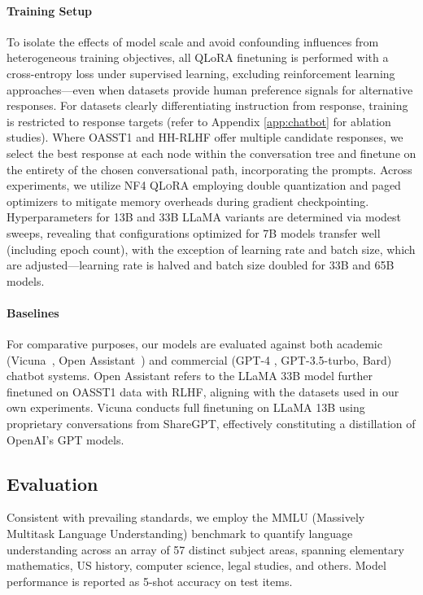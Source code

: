 \paragraph{Training Setup} To isolate the effects of model scale and avoid confounding influences from heterogeneous training objectives, all QLoRA finetuning is performed with a cross-entropy loss under supervised learning, excluding reinforcement learning approaches—even when datasets provide human preference signals for alternative responses. For datasets clearly differentiating instruction from response, training is restricted to response targets (refer to Appendix \ref{app:chatbot} for ablation studies). Where OASST1 and HH-RLHF offer multiple candidate responses, we select the best response at each node within the conversation tree and finetune on the entirety of the chosen conversational path, incorporating the prompts. Across experiments, we utilize NF4 \textsc{QLoRA} employing double quantization and paged optimizers to mitigate memory overheads during gradient checkpointing. Hyperparameters for 13B and 33B LLaMA variants are determined via modest sweeps, revealing that configurations optimized for 7B models transfer well (including epoch count), with the exception of learning rate and batch size, which are adjusted—learning rate is halved and batch size doubled for 33B and 65B models.

\paragraph{Baselines} For comparative purposes, our models are evaluated against both academic (Vicuna~\citep{vicuna2023}, Open Assistant~\citep{kopf2023openassistant}) and commercial (GPT-4 \citep{openai2023gpt}, GPT-3.5-turbo, Bard) chatbot systems. Open Assistant refers to the LLaMA 33B model further finetuned on OASST1 data with RLHF, aligning with the datasets used in our own experiments. Vicuna conducts full finetuning on LLaMA 13B using proprietary conversations from ShareGPT, effectively constituting a distillation of OpenAI’s GPT models.

\subsection{Evaluation}

Consistent with prevailing standards, we employ the MMLU (Massively Multitask Language Understanding) benchmark \citep{hendrycksmeasuring} to quantify language understanding across an array of 57 distinct subject areas, spanning elementary mathematics, US history, computer science, legal studies, and others. Model performance is reported as 5-shot accuracy on test items.

